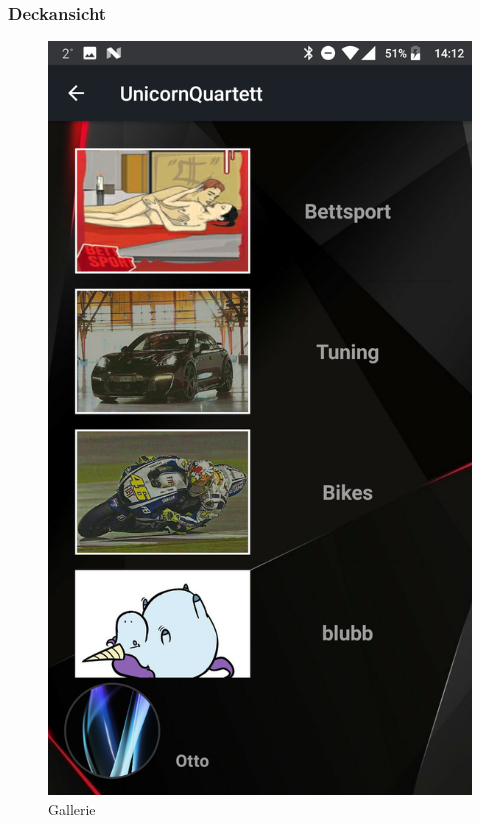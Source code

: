\documentclass{scrartcl}
\begin{document}
\subsubsection{Deckansicht}
\begin{figure}[!ht]
\begin{center} 
\includegraphics[scale=0.1]{img/deck.png}
    \caption{Gallerie}
\end{center}
\end{figure}
\end{document}
